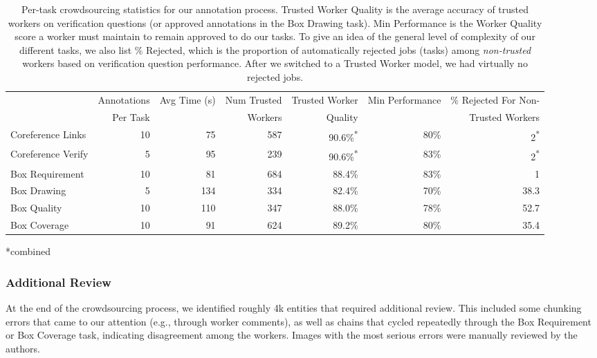 \documentclass[twocolumn]{svjour3}
\begin{document}
\begin{table*}
\caption{Per-task crowdsourcing statistics for our annotation process.  Trusted Worker Quality is the average accuracy of trusted workers on verification questions (or approved annotations in the Box Drawing task). Min Performance is the Worker Quality score a worker must maintain to remain approved to do our tasks. To give an idea of the general level of complexity of our different tasks, we also list \% Rejected, which is the proportion of automatically rejected jobs (tasks) among {\em non-trusted} workers based on verification question performance. After we switched to a Trusted Worker model, we had virtually no rejected jobs.}
\label{table:annoStats}
\small
\begin{center}
\begin{tabular}{|l|r|r|r|r|r|r|}
\hline
& Annotations& \multirow{2}{*}{Avg Time (s)} & Num Trusted & Trusted Worker & \multirow{2}{*}{Min Performance} & \% Rejected For Non-\\
& Per Task & & Workers  & Quality & & Trusted Workers\\
\hline
Coreference Links & 10 & 75 & 587 & 90.6\%\textsuperscript{*} & 80\% & 2\textsuperscript{*}\\
Coreference Verify & 5 & 95 & 239 & 90.6\%\textsuperscript{*} & 83\% & 2\textsuperscript{*}\\
Box Requirement & 10 & 81 & 684 & 88.4\% & 83\% &  1\\
Box Drawing & 5 & 134 & 334 & 82.4\% & 70\% & 38.3\\
Box Quality & 10 & 110 & 347 & 88.0\% & 78\% & 52.7\\
Box Coverage & 10 & 91 & 624 & 89.2\% & 80\% & 35.4\\
\hline
\end{tabular}
\vspace{-1.5mm}
\flushleft\hspace{5mm}\begingroup
    \fontsize{6pt}{6pt}\selectfont
 *combined
\endgroup
\vspace{-3mm}
\end{center}
\end{table*}

\subsubsection{Additional Review}
At the end of the crowdsourcing process, we identified roughly 4k entities that required additional review. This included some chunking errors that came to our attention (e.g., through worker comments), as well as chains that cycled repeatedly through the Box Requirement or Box Coverage task, indicating disagreement among the workers. Images with the most serious errors were manually reviewed by the authors.
\end{document}
